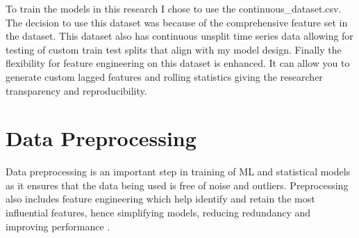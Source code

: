 To train the models in this research I chose to use the continuous\_dataset.csv. The decision to use this dataset was because of the comprehensive feature set in the dataset. This dataset also has continuous unsplit time series data allowing for testing of custom train test splits that align with my model design. Finally the flexibility for feature engineering on this dataset is enhanced. It can allow you to generate custom lagged features and rolling statistics giving the researcher transparency and reproducibility.

\section{Data Preprocessing \label{sec:datapreprocessing}}

Data preprocessing is an important step in training of ML and statistical models as it ensures that the data being used is free of noise and outliers. Preprocessing also includes feature engineering which help identify and retain the most influential features, hence simplifying models, reducing redundancy and improving performance \cite{gao2021cooling}.


